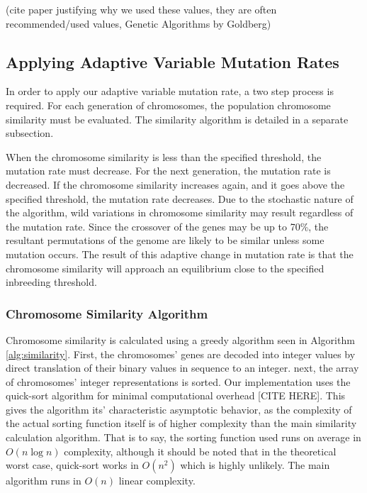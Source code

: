 \documentclass{sig-alternate}
\begin{document}
(cite paper justifying why we used these values, they are often recommended/used values, Genetic Algorithms by Goldberg)


\subsection{Applying Adaptive Variable Mutation Rates}
In order to apply our adaptive variable mutation rate, a two step process is required. For each generation of chromosomes, the population chromosome similarity must be evaluated. The similarity algorithm is detailed in a separate subsection.  

When the chromosome similarity is less than the specified threshold, the mutation rate must decrease. For the next generation, the mutation rate is decreased. If the chromosome similarity increases again, and it goes above the specified threshold, the mutation rate decreases. Due to the stochastic nature of the algorithm, wild variations in chromosome similarity may result regardless of the mutation rate. Since the crossover of the genes may be up to 70\%, the resultant permutations of the genome are likely to be similar unless some mutation occurs. The result of this adaptive change in mutation rate is that the chromosome similarity will approach an equilibrium close to the specified inbreeding threshold.

\subsubsection{Chromosome Similarity Algorithm}
Chromosome similarity is calculated using a greedy algorithm seen in Algorithm \ref{alg:similarity}. First, the chromosomes' genes are decoded into integer values by direct translation of their binary values in sequence to an integer. next, the array of chromosomes' integer representations is sorted. Our implementation uses the quick-sort algorithm for minimal computational overhead [CITE HERE]. This gives the algorithm its' characteristic asymptotic behavior, as the complexity of the actual sorting function itself is of higher complexity than the main similarity calculation algorithm. That is to say, the sorting function used runs on average in $O(n \log n)$ complexity, although it should be noted that in the theoretical worst case, quick-sort works in $O(n^2)$ which is highly unlikely. The main algorithm runs in $O(n)$ linear complexity.
\end{document}

